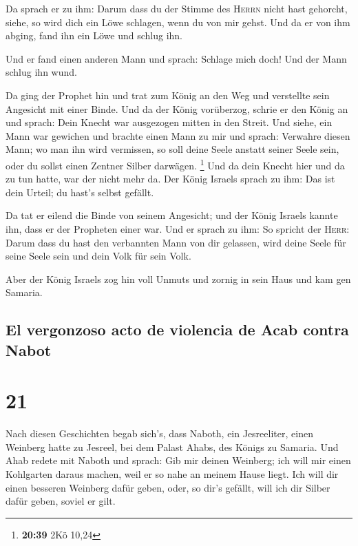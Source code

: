  Da sprach er zu ihm: Darum dass du der Stimme des
\textsc{Herrn} nicht hast gehorcht, siehe, so wird dich ein Löwe
schlagen, wenn du von mir gehst. Und da er von ihm abging, fand ihn ein
Löwe und schlug ihn.

 Und er fand einen anderen Mann und sprach: Schlage mich
doch! Und der Mann schlug ihn wund.

 Da ging der Prophet hin und trat zum König an den Weg
und verstellte sein Angesicht mit einer Binde.  Und da
der König vorüberzog, schrie er den König an und sprach: Dein Knecht war
ausgezogen mitten in den Streit. Und siehe, ein Mann war gewichen und
brachte einen Mann zu mir und sprach: Verwahre diesen Mann; wo man ihn
wird vermissen, so soll deine Seele anstatt seiner Seele sein, oder du
sollst einen Zentner Silber darwägen. \footnote{\textbf{20:39} 2Kö 10,24}
 Und da dein Knecht hier und da zu tun hatte, war der
nicht mehr da. Der König Israels sprach zu ihm: Das ist dein Urteil; du
hast's selbst gefällt.

 Da tat er eilend die Binde von seinem Angesicht; und der
König Israels kannte ihn, dass er der Propheten einer war.
 Und er sprach zu ihm: So spricht der \textsc{Herr}:
Darum dass du hast den verbannten Mann von dir gelassen, wird deine
Seele für seine Seele sein und dein Volk für sein Volk.

 Aber der König Israels zog hin voll Unmuts und zornig in
sein Haus und kam gen Samaria.

\hypertarget{el-vergonzoso-acto-de-violencia-de-acab-contra-nabot}{%
\subsection{El vergonzoso acto de violencia de Acab contra
Nabot}\label{el-vergonzoso-acto-de-violencia-de-acab-contra-nabot}}

\hypertarget{section-20}{%
\section{21}\label{section-20}}

 Nach diesen Geschichten begab sich's, dass Naboth, ein
Jesreeliter, einen Weinberg hatte zu Jesreel, bei dem Palast Ahabs, des
Königs zu Samaria.  Und Ahab redete mit Naboth und sprach:
Gib mir deinen Weinberg; ich will mir einen Kohlgarten daraus machen,
weil er so nahe an meinem Hause liegt. Ich will dir einen besseren
Weinberg dafür geben, oder, so dir's gefällt, will ich dir Silber dafür
geben, soviel er gilt.


